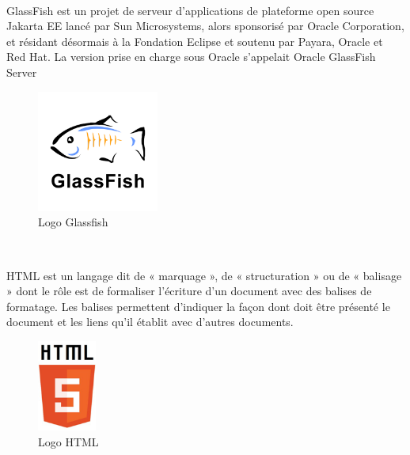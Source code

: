 \\ \par 
GlassFish est un projet de serveur d'applications de plateforme open source Jakarta EE lancé par Sun Microsystems, alors sponsorisé par Oracle Corporation, et résidant désormais à la Fondation Eclipse et soutenu par Payara, Oracle et Red Hat. La version prise en charge sous Oracle s'appelait Oracle GlassFish Server
\\
\begin{figure}[!h]
\begin{center}
\includegraphics[height=4cm]{Pictures/glassfish.png}
\end{center}
\caption{Logo Glassfish}
\end{figure}

\\ \par 
HTML est un langage dit de « marquage », de « structuration » ou de « balisage » dont le rôle est de formaliser l’écriture d’un document avec des balises de formatage. Les balises permettent d’indiquer la façon dont doit être présenté le document et les liens qu’il établit avec d’autres documents.
\\
\begin{figure}[!h]
\begin{center}
\includegraphics[height=3cm]{Pictures/HTML.png}
\end{center}
\caption{Logo HTML}
\end{figure}

